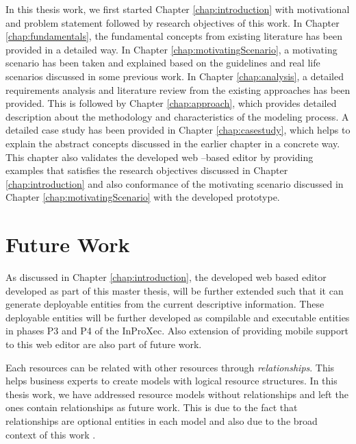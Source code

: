 In this thesis work, we first started Chapter \ref{chap:introduction} with motivational and problem statement followed by research objectives of this work. In Chapter \ref{chap:fundamentals}, the fundamental concepts from existing literature has been provided in a detailed way. In Chapter \ref{chap:motivatingScenario}, a motivating scenario has been taken and explained based on the guidelines and real life scenarios discussed in some previous work. In Chapter \ref{chap:analysis}, a detailed requirements analysis and literature review from the existing approaches has been provided. This is followed by Chapter \ref{chap:approach}, which provides detailed description about the methodology and characteristics of the modeling process. A detailed case study has been provided in Chapter \ref{chap:casestudy}, which helps to explain the abstract concepts discussed in the earlier chapter in a concrete way. This chapter also validates the developed web –based editor by providing examples that satisfies the research objectives discussed in Chapter \ref{chap:introduction} and also conformance of the motivating scenario discussed in Chapter \ref{chap:motivatingScenario} with the developed prototype.

\section*{Future Work}
\label{sec:futurework}
As discussed in Chapter \ref{chap:introduction}, the developed web based editor developed as part of this master thesis, will be further extended such that it can generate deployable entities from the current descriptive information. These deployable entities will be further developed as compilable and executable entities in phases P3 and P4 of the InProXec\cite{Sungur2015}. Also extension of providing mobile support to this web editor are also part of future work. 

Each resources can be related with other resources through \textit{relationships}. This helps business experts to create models with logical resource structures. In this thesis work, we have addressed resource models without relationships and left the ones contain relationships as future work. This is due to the fact that relationships are optional entities in each model and also due to the broad context of this work \cite{Sungur2014a}. 



